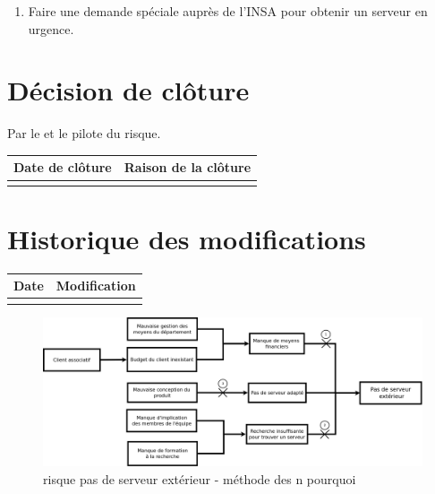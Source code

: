 \begin{enumerate}
	\item Faire une demande spéciale auprès de l'INSA pour obtenir un serveur en urgence.
\end{enumerate}

%
%
%
%

\section*{Décision de clôture}
Par le \CP{} et le pilote du risque.
\begin{table}[H]
\centering
	\begin{tabularx}{16.8cm}{|X|X|}
	\hline
	\rowcolor{gray!40} Date de clôture & Raison de la clôture \\
	\hline
	  & \\
	\hline
	\end{tabularx}
\end{table}

\section*{Historique des modifications}
\begin{table}[H]
\centering
	\begin{tabularx}{16.8cm}{|X|X|}
	\hline
	\rowcolor{gray!40} Date & Modification \\
	\hline
	  & \\
	\hline
	\end{tabularx}
\end{table}
\newpage

\begin{figure}
	\centering
	\includegraphics[scale=0.15]{images/AnalyseRisque_nPourquoi_FDR009}
	\caption{\label{risque pas de serveur ext}risque pas de serveur extérieur - méthode des n pourquoi}
\end{figure}
